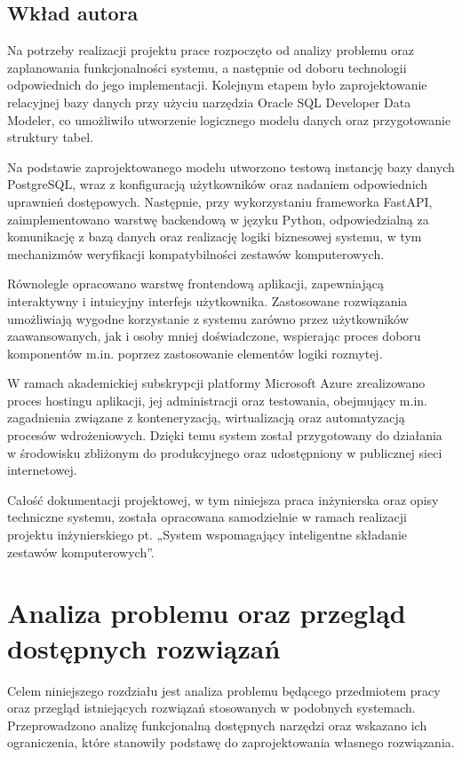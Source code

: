 \documentclass[a4paper,twoside,12pt]{book}
\begin{document}
\newpage
\section{Wkład autora}
Na potrzeby realizacji projektu prace rozpoczęto od analizy problemu oraz
zaplanowania funkcjonalności systemu, a następnie od doboru technologii
odpowiednich do jego implementacji. Kolejnym etapem było zaprojektowanie
relacyjnej bazy danych przy użyciu narzędzia Oracle SQL Developer Data Modeler,
co umożliwiło utworzenie logicznego modelu danych oraz przygotowanie struktury
tabel.

Na podstawie zaprojektowanego modelu utworzono testową instancję bazy danych
PostgreSQL, wraz z konfiguracją użytkowników oraz nadaniem odpowiednich
uprawnień dostępowych. Następnie, przy wykorzystaniu frameworka FastAPI,
zaimplementowano warstwę backendową w języku Python, odpowiedzialną za
komunikację z bazą danych oraz realizację logiki biznesowej systemu, w tym
mechanizmów weryfikacji kompatybilności zestawów komputerowych.

Równolegle opracowano warstwę frontendową aplikacji, zapewniającą interaktywny i
intuicyjny interfejs użytkownika. Zastosowane rozwiązania umożliwiają wygodne
korzystanie z systemu zarówno przez użytkowników zaawansowanych, jak i osoby
mniej doświadczone, wspierając proces doboru komponentów m.in. poprzez
zastosowanie elementów logiki rozmytej.

W ramach akademickiej subskrypcji platformy Microsoft Azure zrealizowano proces hostingu aplikacji, jej administracji oraz testowania,
obejmujący m.in. zagadnienia związane z konteneryzacją, wirtualizacją oraz
automatyzacją procesów wdrożeniowych. Dzięki temu system został przygotowany do
działania w środowisku zbliżonym do produkcyjnego oraz udostępniony w publicznej
sieci internetowej.

Całość dokumentacji projektowej, w tym niniejsza praca inżynierska oraz opisy
techniczne systemu, została opracowana samodzielnie w ramach realizacji projektu
inżynierskiego pt. „System wspomagający inteligentne składanie zestawów
komputerowych”.

\chapter{Analiza problemu oraz przegląd dostępnych rozwiązań}
Celem niniejszego rozdziału jest analiza problemu będącego przedmiotem pracy 
oraz przegląd istniejących rozwiązań stosowanych w podobnych systemach. 
Przeprowadzono analizę funkcjonalną dostępnych narzędzi oraz wskazano ich 
ograniczenia, które stanowiły podstawę do zaprojektowania własnego rozwiązania.
\end{document}
